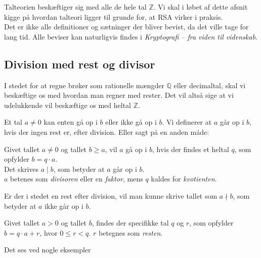 Talteorien beskæftiger sig med alle de hele tal \(\mathbb{Z}\).
Vi skal i løbet af dette afsnit kigge på hvordan talteori ligger til grunde for, at RSA virker i praksis.
\\
Det er ikke alle definitioner og sætninger der bliver bevist, da det ville tage for lang tid.
Alle beviser kan naturligvis findes i \textit{Kryptografi -- fra viden til videnskab}. \cite{krypto}



    \subsection{Division med rest og divisor}
    I stedet for at regne brøker som rationelle mængder \(\mathbb{Q}\) eller decimaltal, skal vi beskæftige os med hvordan man regner med rester.
    Det vil altså sige at vi udelukkende vil beskæftige os med heltal \(\mathbb{Z}\).

    Et tal \(a \neq 0\) kan enten gå op i \(b\) eller ikke gå op i \(b\).
    Vi definerer at \(a\) går op i \(b\), hvis der ingen rest er, efter division. Eller sagt på en anden måde:


    \begin{definition}
        \label{heldiv}
        Givet tallet \(a \neq 0\) og tallet \(b \geq a\), vil \(a\) gå op i \(b\),
        hvis der findes et heltal \(q\), som opfylder \(b = q \cdot a\).\\
        Det skrives \(a \mid b\), som betyder at \(a\) går op i \(b\).\\
        \(a\) betenes som \textit{divisoren} eller en \textit{faktor},
        mens \(q\) kaldes for \textit{kvotienten}.\cite[70]{krypto}
    \end{definition}

    Er der i stedet en rest efter division, vil man kunne skrive tallet som \(a \nmid b\), som betyder at \(a\) ikke går op i \(b\).

    \begin{sent}
        \label{rest}
        Givet tallet \(a > 0\) og tallet \(b\), findes der specifikke tal \(q\) og \(r\), som opfylder \(b = q \cdot a + r\), hvor \(0 \leq r < q\). \(r\) betegnes som \textit{resten}.
    \end{sent}

    Det ses ved nogle eksempler


